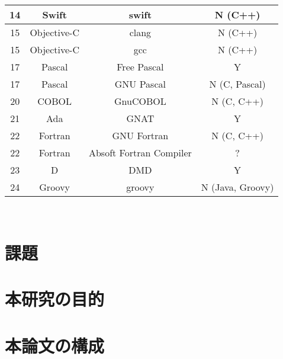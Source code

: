 \begin{table}[tb]
\begin{center}
\begin{tabular}{|c|c|c|c|}
            \hline
            14 & Swift & swift & N (C++) \\
            \hline
            15 & Objective-C & clang & N (C++) \\
            \hline
            15 & Objective-C & gcc & N (C++) \\
            \hline
            17 & Pascal & Free Pascal & Y \\
            \hline
            17 & Pascal & GNU Pascal & N (C, Pascal) \\
            \hline
            20 & COBOL & GnuCOBOL & N (C, C++) \\
            \hline
            21 & Ada & GNAT & Y \\
            \hline
            22 & Fortran & GNU Fortran & N (C, C++) \\
            \hline
            22 & Fortran & Absoft Fortran Compiler & ? \\
            \hline
            23 & D & DMD & Y \\
            \hline
            24 & Groovy & groovy & N (Java, Groovy) \\
            \hline
        \end{tabular}
        \label{table:bootstrapping-languages}
    \end{center}
\end{table}


~\cite{akamai}

\section{課題}
\label{background:internetroute}

\section{本研究の目的}
\label{background:ml3}

\section{本論文の構成}


